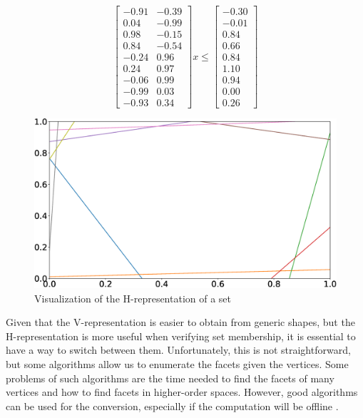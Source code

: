 \begin{equation}
  \label{eq:h-rep-example}
  \begin{bmatrix}
    -0.91 & -0.39 \\
    0.04  & -0.99 \\
    0.98  & -0.15 \\
    0.84  & -0.54 \\
    -0.24 & 0.96  \\
    0.24  & 0.97  \\
    -0.06 & 0.99  \\
    -0.99 & 0.03  \\
    -0.93 & 0.34
  \end{bmatrix}x \leq
  \begin{bmatrix}
    -0.30 \\
    -0.01 \\
    0.84  \\
    0.66  \\
    0.84  \\
    1.10  \\
    0.94  \\
    0.00  \\
    0.26
  \end{bmatrix}
\end{equation}

\begin{figure}[!htb]
  \centering
  \includegraphics[width=\linewidth]{imgs/h-rep}
  \caption{Visualization of the H-representation of a set}%
  \label{fig:h-rep-example}
\end{figure}

Given that the V-representation is easier to obtain from generic shapes, but the
H-representation is more useful when verifying set membership, it is essential
to have a way to switch between them. Unfortunately, this is not
straightforward, but some algorithms allow us to enumerate the facets given the
vertices. Some problems of such algorithms are the time needed to find the
facets of many vertices and how to find facets in higher-order spaces. However,
good algorithms can be used for the conversion, especially if the computation
will be offline
\parencite{avis.bremner.ea:how,graham.frances-yao:finding,lee:on,mccallum.avis:linear}.

